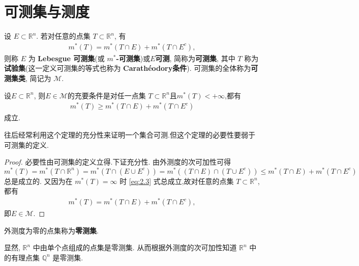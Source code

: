 \documentclass[../../main.tex]{subfiles}
\begin{document}
\section{可测集与测度}

\begin{definition}[可测集]
设 \(E \subset \mathbb{R}^n\). 若对任意的点集 \(T \subset \mathbb{R}^n\), 有
\begin{align*}
m^*(T)=m^*(T \cap E)+m^*(T \cap E^c), 
\end{align*}
则称 \(E\) 为 \textbf{Lebesgue 可测集}(或 \textbf{\(m^*\)-可测集})或$E$\textbf{可测}, 简称为\textbf{可测集}, 其中 \(T\) 称为\textbf{试验集}(这一定义可测集的等式也称为 \textbf{Carathéodory条件}). 可测集的全体称为\textbf{可测集类}, 简记为 \(\mathscr{M}\). 
\end{definition}

\begin{theorem}[集合可测的充要条件]\label{theorem:可测的充要条件}
设\(E\subset \mathbb{R}^n\), 则$E\in \mathscr{M}$的充要条件是对任一点集 \(T \subset \mathbb{R}^n\)且\(m^*(T)< + \infty\),都有
\begin{align}
m^*(T) \geq m^*(T \cap E)+m^*(T \cap E^c) \label{eq:2.3}
\end{align}
成立. 
\end{theorem}
\begin{remark}
往后经常利用这个定理的充分性来证明一个集合可测.但这个定理的必要性要弱于可测集的定义.
\end{remark}
\begin{proof}
必要性由可测集的定义立得.下证充分性.
由外测度的次可加性可得
\[
m^*(T)=m^*\left( T\cap \mathbb{R} ^n \right) =m^*\left( T\cap \left( E\cup E^c \right) \right) =m^*\left( \left( T\cap E \right) \cap \left( T\cup E^c \right) \right)  \leq m^*(T \cap E)+m^*(T \cap E^c)
\]
总是成立的. 又因为在 \(m^*(T)=\infty\) 时 \eqref{eq:2.3} 式总成立,故对任意的点集 \(T \subset \mathbb{R}^n\),都有
\begin{align*}
m^*(T)=m^*(T \cap E)+m^*(T \cap E^c), 
\end{align*}
即$E\in \mathscr{M}$.
\end{proof}

\begin{definition}[零测集]
外测度为零的点集称为\textbf{零测集}. 
\end{definition}
\begin{remark}
显然, \(\mathbb{R}^n\) 中由单个点组成的点集是零测集. 从而根据外测度的次可加性知道 \(\mathbb{R}^n\) 中的有理点集 \(\mathbb{Q}^n\) 是零测集.
\end{remark}
\end{document}
